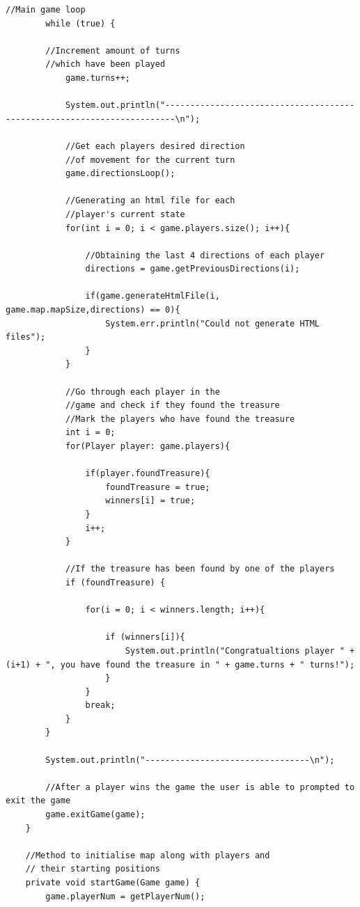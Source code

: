 \documentclass[a4paper,12pt]{extarticle}
\begin{document}
\begin{lstlisting}[caption=The initial code of the Game class, label=amb]
        //Main game loop
        while (true) {
        
        //Increment amount of turns 
        //which have been played        
            game.turns++;

            System.out.println("------------------------------------------------------------------------\n");

            //Get each players desired direction 
            //of movement for the current turn
            game.directionsLoop();

            //Generating an html file for each 
            //player's current state
            for(int i = 0; i < game.players.size(); i++){

                //Obtaining the last 4 directions of each player
                directions = game.getPreviousDirections(i);

                if(game.generateHtmlFile(i, game.map.mapSize,directions) == 0){
                    System.err.println("Could not generate HTML files");
                }
            }

            //Go through each player in the 
            //game and check if they found the treasure
            //Mark the players who have found the treasure
            int i = 0;
            for(Player player: game.players){

                if(player.foundTreasure){
                    foundTreasure = true;
                    winners[i] = true;
                }
                i++;
            }

            //If the treasure has been found by one of the players
            if (foundTreasure) {

                for(i = 0; i < winners.length; i++){

                    if (winners[i]){
                        System.out.println("Congratualtions player " + (i+1) + ", you have found the treasure in " + game.turns + " turns!");
                    }
                }
                break;
            }
        }

        System.out.println("---------------------------------\n");

        //After a player wins the game the user is able to prompted to exit the game
        game.exitGame(game);
    }

    //Method to initialise map along with players and
    // their starting positions
    private void startGame(Game game) {
        game.playerNum = getPlayerNum();


\end{lstlisting}
\end{document}
